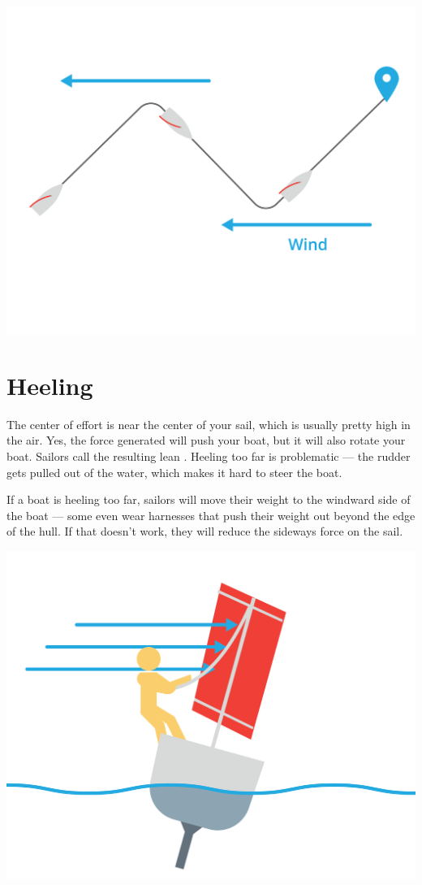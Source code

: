 \begin{center}
    \includegraphics[width=.75\textwidth]{tacking.png}

\end{center}

\section{Heeling}

The center of effort is near the center of your sail,  which is usually pretty high in the air. Yes, the force generated will push your boat,  but it will also rotate your boat.  Sailors call
the resulting lean . Heeling too far is problematic --- the rudder gets pulled out of the water, which makes it hard to steer the boat.



If a boat is heeling too far,  sailors will move their weight to the windward side of the boat --- some even wear harnesses that push their weight out beyond the edge of the hull.
If that doesn't work, they will reduce the sideways force on the sail.

\begin{center}
    \includegraphics[width=.75\textwidth]{heeling2.png}

\end{center}

